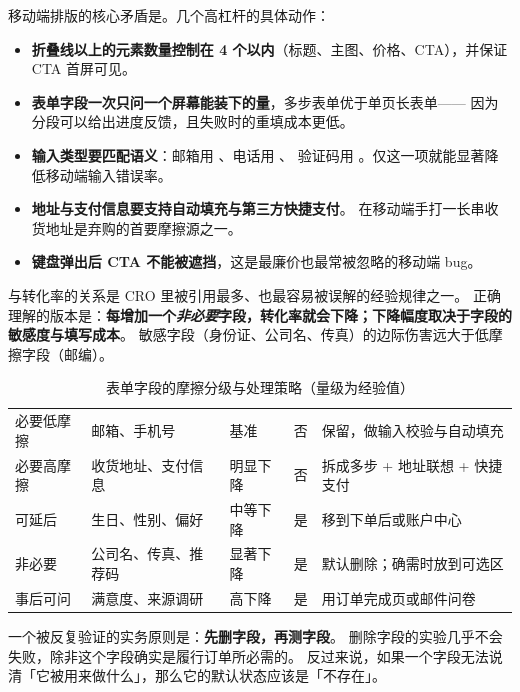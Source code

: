 移动端排版的核心矛盾是。几个高杠杆的具体动作：

\begin{itemize}
  \item \textbf{折叠线以上的元素数量控制在 4 个以内}（标题、主图、价格、CTA），并保证 CTA 首屏可见。
  \item \textbf{表单字段一次只问一个屏幕能装下的量}，多步表单优于单页长表单——
        因为分段可以给出进度反馈，且失败时的重填成本更低。
  \item \textbf{输入类型要匹配语义}：邮箱用 、电话用 、
        验证码用 。仅这一项就能显著降低移动端输入错误率。
  \item \textbf{地址与支付信息要支持自动填充与第三方快捷支付}。
        在移动端手打一长串收货地址是弃购的首要摩擦源之一。
  \item \textbf{键盘弹出后 CTA 不能被遮挡}，这是最廉价也最常被忽略的移动端 bug。
\end{itemize}

 与转化率的关系是 CRO 里被引用最多、也最容易被误解的经验规律之一。
正确理解的版本是：\textbf{每增加一个\emph{非必要}字段，转化率就会下降；下降幅度取决于字段的敏感度与填写成本}。
敏感字段（身份证、公司名、传真）的边际伤害远大于低摩擦字段（邮编）。

\begin{table}[htbp]
\centering
\caption{表单字段的摩擦分级与处理策略（量级为经验值）}
\label{tab:formfields}
\small
\begin{tabularx}{\textwidth}{L{2.1cm} L{2.6cm} L{2.6cm} L{2.3cm} Y}
\toprule
{} &  &  &  &  \\
\midrule
必要低摩擦 & 邮箱、手机号 & 基准 & 否 & 保留，做输入校验与自动填充 \\
必要高摩擦 & 收货地址、支付信息 & 明显下降 & 否 & 拆成多步 + 地址联想 + 快捷支付 \\
可延后 & 生日、性别、偏好 & 中等下降 & 是 & 移到下单后或账户中心 \\
非必要 & 公司名、传真、推荐码 & 显著下降 & 是 & 默认删除；确需时放到可选区 \\
事后可问 & 满意度、来源调研 & 高下降 & 是 & 用订单完成页或邮件问卷 \\
\bottomrule
\end{tabularx}
\end{table}

一个被反复验证的实务原则是：\textbf{先删字段，再测字段}。
删除字段的实验几乎不会失败，除非这个字段确实是履行订单所必需的。
反过来说，如果一个字段无法说清「它被用来做什么」，那么它的默认状态应该是「不存在」。

